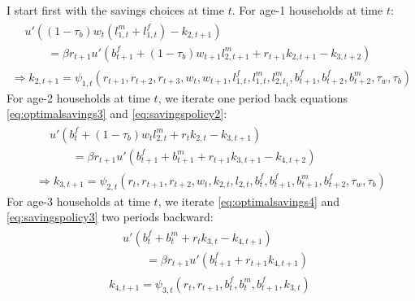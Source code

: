 \documentclass[ProjectUYA]{subfiles}
\begin{document}
 I start first with the savings choices at time $t.$ For age-1 households at time $t$:
 \begin{subequations}
 \label{eq:savingschoice1t}
 		\begin{gather}
 			\begin{aligned}
 				& u'\left((1-\tau_b)w_t (l_{1,t}^m+l_{1,t}^f) -k_{2,t+1}\right) \\
		&\qquad = \beta r_{t+1}
		u'\left(b_{t+1}^f+(1-\tau_b)w_{t+1} l_{2,t+1}^m + r_{t+1}k_{2,t+1} -k_{3,t+2}\right)
 			\end{aligned}  \label{eq:optimalsavings2t}\\
 	\Rightarrow k_{2,t+1}= \psi_{1,t} (r_{t+1},r_{t+2},r_{t+3},w_t,w_{t+1},l_{1,t}^f,l_{1,t}^m,l_{2,t_1}^m,
 	 b_{t+1}^f,b_{t+2}^f,b_{t+2}^m, \tau_w,\tau_b)\label{eq:savingspolicy1t}
 		\end{gather}
 \end{subequations}
 For age-2 households at time $t$, we iterate one period back equations \eqref{eq:optimalsavings3} and \eqref{eq:savingspolicy2}:
 \begin{subequations}
 	\label{eq:savingschoice2t}
 	\begin{gather}
 	\begin{aligned}
& u'\left(b_{t}^f+(1-\tau_b)w_{t} l_{2,t}^m + r_{t}k_{2,t} -k_{3,t+1}\right) \\
		&\qquad = \beta r_{t+1}
		u'\left(b_{t+1}^f+ b_{t+1}^m  + r_{t+1}k_{3,t+1} -k_{4,t+2}\right)
		\label{eq:optimalsavings3t}
 	\end{aligned}\\
 	\Rightarrow k_{3,t+1}=\psi_{2,t}(r_{t},r_{t+1},r_{t+2},w_{t}, k_{2,t},l_{2,t},b_{t}^f,b_{t+1}^f,b_{t+1}^m,b_{t+2}^f,\tau_w,\tau_b)
 	\label{eq:savingspolicy2t}
 	\end{gather}
 \end{subequations}
 For age-3 households at time $t$, we iterate \eqref{eq:optimalsavings4} and \eqref{eq:savingspolicy3} two periods backward:
  \begin{subequations}
 	\label{eq:savingschoice3t}
 	\begin{gather}
 	\begin{aligned}
&u'\left( b_{t}^f+ b_{t}^m  + r_{t}k_{3,t} -k_{4,t+1}\right)\\
		&\qquad =\beta  r_{t+1} u'\left(b_{t+1}^f + r_{t+1}k_{4,t+1}\right)
		\label{eq:optimalsavings4t}
 	\end{aligned}\\
 k_{4,t+1}=\psi_{3,t}(r_{t},r_{t+1},b_{t}^f, b_{t}^m,b_{t+1}^f,k_{3,t})
 	\label{eq:savingspolicy3t}
 	\end{gather}
 \end{subequations}
\end{document}
